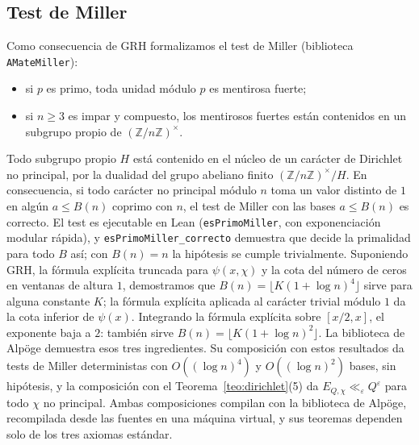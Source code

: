 \documentclass[11pt,a4paper]{amsart}
\theoremstyle{definition}
\theoremstyle{remark}
\begin{document}
\subsection*{Test de Miller}
Como consecuencia de GRH formalizamos el test de Miller (biblioteca \texttt{AMateMiller}):
\begin{itemize}
\item si $p$ es primo, toda unidad m\'odulo $p$ es mentirosa fuerte;
\item si $n\ge3$ es impar y compuesto, los mentirosos fuertes est\'an contenidos en un subgrupo propio de $(\mathbb Z/n\mathbb Z)^\times$.
\end{itemize}
Todo subgrupo propio $H$ est\'a contenido en el n\'ucleo de un car\'acter de Dirichlet no principal, por la dualidad del grupo abeliano finito $(\mathbb Z/n\mathbb Z)^\times/H$. En consecuencia, si todo car\'acter no principal m\'odulo $n$ toma un valor distinto de $1$ en alg\'un $a\le B(n)$ coprimo con $n$, el test de Miller con las bases $a\le B(n)$ es correcto. El test es ejecutable en Lean (\texttt{esPrimoMiller}, con exponenciaci\'on modular r\'apida), y \texttt{esPrimoMiller\_correcto} demuestra que decide la primalidad para todo $B$ as\'i; con $B(n)=n$ la hip\'otesis se cumple trivialmente. Suponiendo GRH, la f\'ormula expl\'icita truncada para $\psi(x,\chi)$ y la cota del n\'umero de ceros en ventanas de altura $1$, demostramos que $B(n)=\lfloor K(1+\log n)^4\rfloor$ sirve para alguna constante $K$; la f\'ormula expl\'icita aplicada al car\'acter trivial m\'odulo $1$ da la cota inferior de $\psi(x)$. Integrando la f\'ormula expl\'icita sobre $[x/2,x]$, el exponente baja a $2$: tambi\'en sirve $B(n)=\lfloor K(1+\log n)^2\rfloor$. La biblioteca de Alp\"oge demuestra esos tres ingredientes. Su composici\'on con estos resultados da tests de Miller deterministas con $O((\log n)^4)$ y $O((\log n)^2)$ bases, sin hip\'otesis, y la composici\'on con el Teorema~\ref{teo:dirichlet}(5) da $E_{Q,\chi}\ll_\varepsilon Q^\varepsilon$ para todo $\chi$ no principal. Ambas composiciones compilan con la biblioteca de Alp\"oge, recompilada desde las fuentes en una m\'aquina virtual, y sus teoremas dependen solo de los tres axiomas est\'andar.
\end{document}
